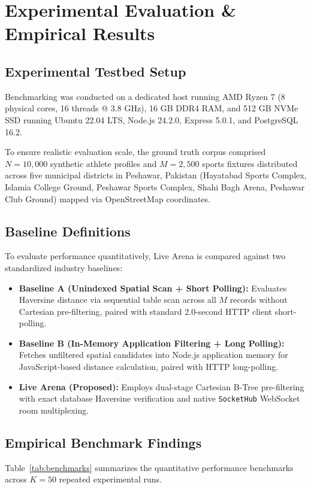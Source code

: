 \documentclass[conference]{IEEEtran}
\begin{document}
\section{Experimental Evaluation \& Empirical Results}

\subsection{Experimental Testbed Setup}
Benchmarking was conducted on a dedicated host running AMD Ryzen 7 (8 physical cores, 16 threads @ 3.8 GHz), 16 GB DDR4 RAM, and 512 GB NVMe SSD running Ubuntu 22.04 LTS, Node.js 24.2.0, Express 5.0.1, and PostgreSQL 16.2. 

To ensure realistic evaluation scale, the ground truth corpus comprised $N = 10,000$ synthetic athlete profiles and $M = 2,500$ sports fixtures distributed across five municipal districts in Peshawar, Pakistan (Hayatabad Sports Complex, Islamia College Ground, Peshawar Sports Complex, Shahi Bagh Arena, Peshawar Club Ground) mapped via OpenStreetMap coordinates.

\subsection{Baseline Definitions}
To evaluate performance quantitatively, Live Arena is compared against two standardized industry baselines:
\begin{itemize}
    \item \textbf{Baseline A (Unindexed Spatial Scan + Short Polling):} Evaluates Haversine distance via sequential table scan across all $M$ records without Cartesian pre-filtering, paired with standard 2.0-second HTTP client short-polling.
    \item \textbf{Baseline B (In-Memory Application Filtering + Long Polling):} Fetches unfiltered spatial candidates into Node.js application memory for JavaScript-based distance calculation, paired with HTTP long-polling.
    \item \textbf{Live Arena (Proposed):} Employs dual-stage Cartesian B-Tree pre-filtering with exact database Haversine verification and native \texttt{SocketHub} WebSocket room multiplexing.
\end{itemize}

\subsection{Empirical Benchmark Findings}
Table~\ref{tab:benchmarks} summarizes the quantitative performance benchmarks across $K = 50$ repeated experimental runs.
\end{document}
